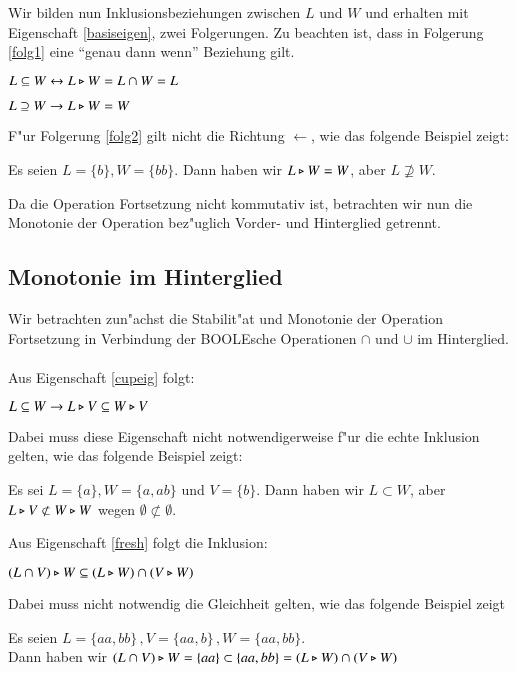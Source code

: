 Wir bilden nun Inklusionsbeziehungen zwischen $L$ und $W$ und erhalten mit Eigenschaft \ref{basiseigen}, zwei Folgerungen.
Zu beachten ist, dass in Folgerung \ref{folg1} eine "`genau dann wenn"' Beziehung gilt.

\begin{folg}\label{folg1}
$L\subseteq W \leftrightarrow L\triangleright W = L\cap W = L$
\end{folg}
\begin{folg}\label{folg2}
$L\supseteq W \to L\triangleright W = W$
\end{folg}
F"ur Folgerung \ref{folg2} gilt nicht die Richtung $\leftarrow$, wie das folgende Beispiel zeigt:
\begin{beispiel}
Es seien $L=\{b\}, W=\{bb\}$. Dann haben wir $L\triangleright W = W$, aber $L\not\supseteq W$.
\end{beispiel}

Da die Operation Fortsetzung nicht kommutativ ist, betrachten wir nun die Monotonie der Operation bez"uglich Vorder- und Hinterglied getrennt.
\subsection{Monotonie im Hinterglied}

Wir betrachten zun"achst die Stabilit"at und Monotonie der Operation Fortsetzung in Verbindung der BOOLEsche Operationen $\cap$ und $\cup$ im Hinterglied.\\\\
Aus Eigenschaft \ref{cupeig} folgt:
\begin{eigen}\label{fresh}
$L\subseteq W \to L\triangleright V \subseteq W \triangleright V$
\end{eigen}
Dabei muss diese Eigenschaft nicht notwendigerweise f"ur die echte Inklusion gelten, wie das folgende Beispiel zeigt:
\begin{beispiel}
Es sei $L=\{a\}, W=\{a,ab\}$ und $V=\{b\}$. Dann haben wir $L\subset W$, aber $L\triangleright V \not\subset W\triangleright W$ wegen $\emptyset \not\subset\emptyset$.
\end{beispiel}

Aus Eigenschaft \ref{fresh} folgt die Inklusion:
\begin{eigen}
$(L\cap V) \triangleright W \subseteq (L\triangleright W) \cap (V\triangleright W)$
\end{eigen}
Dabei muss nicht notwendig die Gleichheit gelten, wie das folgende Beispiel zeigt
\begin{beispiel}
Es seien $L= \{aa,bb\}\, ,V = \{aa,b\}\, ,W = \{aa,bb\}$. \\Dann haben wir $(L\cap V) \triangleright W = \{aa\} \subset \{aa,bb\} = (L\triangleright W) \cap (V\triangleright W)$
\end{beispiel}

